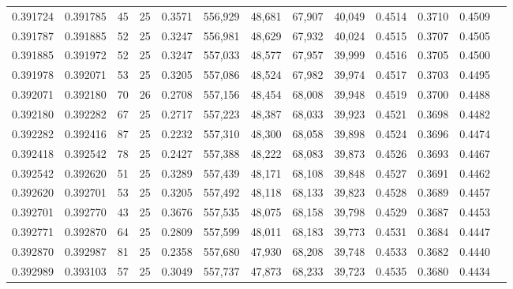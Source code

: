 \begin{tabular}{rrrrrrrrrrrrr}
0.391724 & 0.391785 &    45 &  25 &                                     0.3571 & 556,929 &  48,681 &  67,907 &  40,049 & 0.4514 & 0.3710 & 0.4509 \\
0.391787 & 0.391885 &    52 &  25 &                                     0.3247 & 556,981 &  48,629 &  67,932 &  40,024 & 0.4515 & 0.3707 & 0.4505 \\
0.391885 & 0.391972 &    52 &  25 &                                     0.3247 & 557,033 &  48,577 &  67,957 &  39,999 & 0.4516 & 0.3705 & 0.4500 \\
0.391978 & 0.392071 &    53 &  25 &                                     0.3205 & 557,086 &  48,524 &  67,982 &  39,974 & 0.4517 & 0.3703 & 0.4495 \\
0.392071 & 0.392180 &    70 &  26 &                                     0.2708 & 557,156 &  48,454 &  68,008 &  39,948 & 0.4519 & 0.3700 & 0.4488 \\
0.392180 & 0.392282 &    67 &  25 &                                     0.2717 & 557,223 &  48,387 &  68,033 &  39,923 & 0.4521 & 0.3698 & 0.4482 \\
0.392282 & 0.392416 &    87 &  25 &                                     0.2232 & 557,310 &  48,300 &  68,058 &  39,898 & 0.4524 & 0.3696 & 0.4474 \\
0.392418 & 0.392542 &    78 &  25 &                                     0.2427 & 557,388 &  48,222 &  68,083 &  39,873 & 0.4526 & 0.3693 & 0.4467 \\
0.392542 & 0.392620 &    51 &  25 &                                     0.3289 & 557,439 &  48,171 &  68,108 &  39,848 & 0.4527 & 0.3691 & 0.4462 \\
0.392620 & 0.392701 &    53 &  25 &                                     0.3205 & 557,492 &  48,118 &  68,133 &  39,823 & 0.4528 & 0.3689 & 0.4457 \\
0.392701 & 0.392770 &    43 &  25 &                                     0.3676 & 557,535 &  48,075 &  68,158 &  39,798 & 0.4529 & 0.3687 & 0.4453 \\
0.392771 & 0.392870 &    64 &  25 &                                     0.2809 & 557,599 &  48,011 &  68,183 &  39,773 & 0.4531 & 0.3684 & 0.4447 \\
0.392870 & 0.392987 &    81 &  25 &                                     0.2358 & 557,680 &  47,930 &  68,208 &  39,748 & 0.4533 & 0.3682 & 0.4440 \\
0.392989 & 0.393103 &    57 &  25 &                                     0.3049 & 557,737 &  47,873 &  68,233 &  39,723 & 0.4535 & 0.3680 & 0.4434 \\

\end{tabular}
